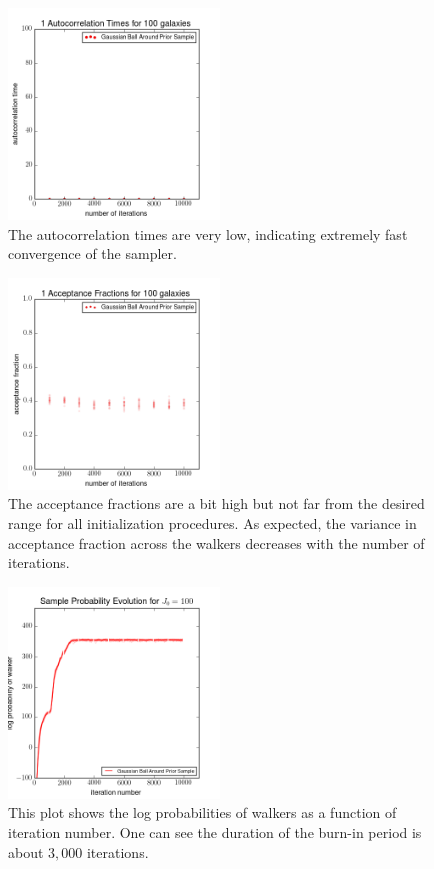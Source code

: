 \documentclass[preprint]{aastex}
\begin{document}
\begin{figure}
\includegraphics[width=0.5\textwidth]{real/times.png}
\caption{The autocorrelation times are very low, indicating extremely fast convergence of the sampler.}
\label{fig:realacor}
\end{figure}

\begin{figure}
\includegraphics[width=0.5\textwidth]{real/fracs.png}
\caption{The acceptance fractions are a bit high but not far from the desired range for all initialization procedures.  As expected, the variance in acceptance fraction across the walkers decreases with the number of iterations.}
\label{fig:realfrac}
\end{figure}

\begin{figure}
\includegraphics[width=0.5\textwidth]{real/probs.png}
\caption{This plot shows the log probabilities of walkers as a function of iteration number.  One can see the duration of the burn-in period is about $3,000$ iterations.}
\label{fig:realprob}
\end{figure}
\end{document}
